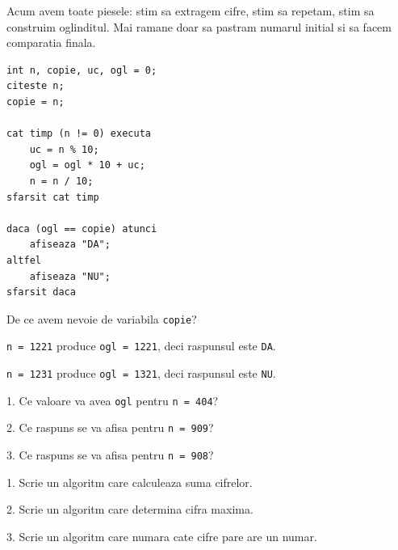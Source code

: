 
\begin{missionbox}
  Acum avem toate piesele: stim sa extragem cifre, stim sa repetam, stim sa construim oglinditul. Mai ramane doar sa pastram numarul initial si sa facem comparatia finala.
\end{missionbox}

\begin{conceptbox}
\begin{lstlisting}[style=codequest]
int n, copie, uc, ogl = 0;
citeste n;
copie = n;

cat timp (n != 0) executa
    uc = n % 10;
    ogl = ogl * 10 + uc;
    n = n / 10;
sfarsit cat timp

daca (ogl == copie) atunci
    afiseaza "DA";
altfel
    afiseaza "NU";
sfarsit daca
\end{lstlisting}
\end{conceptbox}

\begin{guidebox}
  De ce avem nevoie de variabila \texttt{copie}?
\end{guidebox}

\newpage
{}

\begin{examplebox}
  \texttt{n = 1221} produce \texttt{ogl = 1221}, deci raspunsul este \texttt{DA}.

  \texttt{n = 1231} produce \texttt{ogl = 1321}, deci raspunsul este \texttt{NU}.
\end{examplebox}

\begin{guidebox}
  1. Ce valoare va avea \texttt{ogl} pentru \texttt{n = 404}?

  2. Ce raspuns se va afisa pentru \texttt{n = 909}?

  3. Ce raspuns se va afisa pentru \texttt{n = 908}?
\end{guidebox}

\newpage
{}

\begin{solobox}
  1. Scrie un algoritm care calculeaza suma cifrelor.

  2. Scrie un algoritm care determina cifra maxima.

  3. Scrie un algoritm care numara cate cifre pare are un numar.
\end{solobox}

